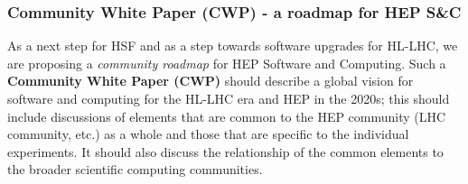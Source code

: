 \begin{frame}
\frametitle{Community White Paper (CWP) - a roadmap for HEP S\&C}

\noindent As a next step for HSF and as a step towards software upgrades for HL-LHC, we are proposing a {\em community roadmap} for HEP Software and Computing.  Such a {\bf Community White Paper (CWP)} should describe a global
vision for software and computing for the HL-LHC era and HEP in the 2020s;
this should include discussions of elements that are common to
the HEP community (LHC community, etc.) as a whole and those that are specific
to the individual experiments.
It should also discuss the relationship of the common elements
to the broader scientific computing communities.

\end{frame}


